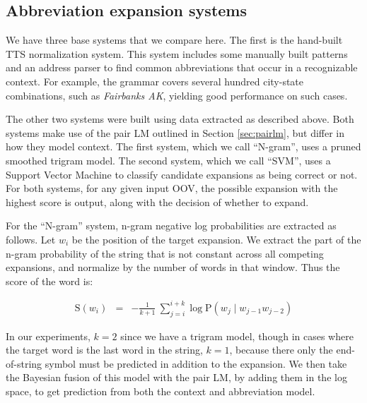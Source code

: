 \documentclass[11pt]{article}
\begin{document}
\vspace{-0.2cm}
\subsection{Abbreviation expansion systems}
We have three base systems that we compare here.  The first is the hand-built
TTS normalization system.  This system includes some manually built
patterns and an address parser to find common abbreviations that occur in a
recognizable context. For example, the grammar covers several hundred city-state
combinations, such as \emph{Fairbanks AK},
yielding good performance on such cases.

The other two systems were built using data extracted as described above.  Both
systems make use of the pair LM outlined in Section \ref{sec:pairlm}, but differ
in how they model context.  The first system, which we call ``N-gram'', uses a
pruned  smoothed trigram model.  The second system, which we
call ``SVM'', uses a Support Vector Machine \cite{cortes1995support} to classify
candidate expansions as being correct or not.  For both systems, for any given
input OOV, the possible expansion with the highest score is output, along with
the decision of whether to expand.

For the ``N-gram'' system, n-gram negative log probabilities are extracted as
follows.  Let $w_i$ be the position of the target expansion.  We extract the
part of the n-gram probability of the string that is not constant across all
competing expansions, and normalize by the number of words in that window.
Thus the score of the word is:\vspace*{-0.2in}

\begin{eqnarray}
\mathrm{S}(w_i) &=& -\frac{1}{k+1}~\sum_{j=i}^{i+k} \log \mathrm{P}(w_j \mid w_{j-1} w_{j-2})\nonumber
\end{eqnarray}\vspace*{-0.15in}

\noindent In our experiments, $k=2$ since we have a trigram model, though in
cases where the target word is the last word in the string, $k=1$,
because there only the end-of-string symbol must be
predicted in addition to the expansion. We then take the Bayesian
fusion of this model with the pair LM, by adding them in
the log space, to get prediction from both the context and abbreviation model.
\end{document}
